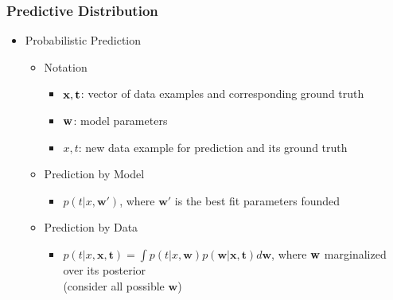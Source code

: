 \subsubsection{Predictive Distribution}
\begin{itemize}
\item Probabilistic Prediction
	\begin{itemize}
	\item Notation
		\begin{itemize}
		\item $\bf x, \bf t$: vector of data examples and corresponding ground truth
		\item $\bf w$: model parameters
		\item $x, t$: new data example for prediction and its ground truth
		\end{itemize}
	\item Prediction by Model
		\begin{itemize}
		\item $p(t|x, \mathbf{w}')$, where $\mathbf w'$ is the best fit parameters founded
		\end{itemize}
	\item Prediction by Data
		\begin{itemize}
		\item $\displaystyle p(t|x,\mathbf{x},\mathbf{t}) = \int p(t|x,\mathbf{w})p(\mathbf{w}|\mathbf{x},\mathbf{t}) d\mathbf w$, where $\bf w$ marginalized over its posterior \\
		(consider all possible $\mathbf w$)
		\end{itemize}
	\end{itemize}
\end{itemize}